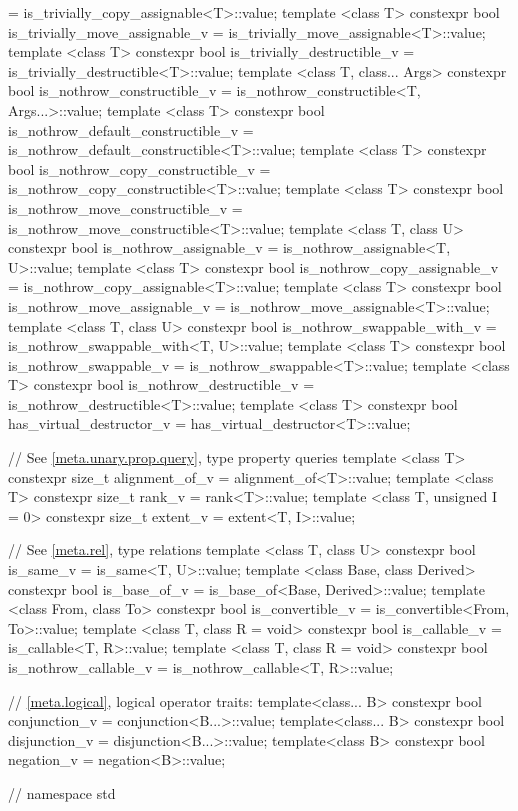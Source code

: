 \begin{codeblock}
{    = is_trivially_copy_assignable<T>::value;
  template <class T> constexpr bool is_trivially_move_assignable_v
    = is_trivially_move_assignable<T>::value;
  template <class T> constexpr bool is_trivially_destructible_v
    = is_trivially_destructible<T>::value;
  template <class T, class... Args> constexpr bool is_nothrow_constructible_v
    = is_nothrow_constructible<T, Args...>::value;
  template <class T> constexpr bool is_nothrow_default_constructible_v
    = is_nothrow_default_constructible<T>::value;
  template <class T> constexpr bool is_nothrow_copy_constructible_v
    = is_nothrow_copy_constructible<T>::value;
  template <class T> constexpr bool is_nothrow_move_constructible_v
    = is_nothrow_move_constructible<T>::value;
  template <class T, class U> constexpr bool is_nothrow_assignable_v
    = is_nothrow_assignable<T, U>::value;
  template <class T> constexpr bool is_nothrow_copy_assignable_v
    = is_nothrow_copy_assignable<T>::value;
  template <class T> constexpr bool is_nothrow_move_assignable_v
    = is_nothrow_move_assignable<T>::value;
  template <class T, class U> constexpr bool is_nothrow_swappable_with_v
    = is_nothrow_swappable_with<T, U>::value;
  template <class T> constexpr bool is_nothrow_swappable_v
    = is_nothrow_swappable<T>::value;
  template <class T> constexpr bool is_nothrow_destructible_v
    = is_nothrow_destructible<T>::value;
  template <class T> constexpr bool has_virtual_destructor_v
    = has_virtual_destructor<T>::value;

  // See \ref{meta.unary.prop.query}, type property queries
  template <class T> constexpr size_t alignment_of_v
    = alignment_of<T>::value;
  template <class T> constexpr size_t rank_v
    = rank<T>::value;
  template <class T, unsigned I = 0> constexpr size_t extent_v
    = extent<T, I>::value;

  // See \ref{meta.rel}, type relations
  template <class T, class U> constexpr bool is_same_v
    = is_same<T, U>::value;
  template <class Base, class Derived> constexpr bool is_base_of_v
    = is_base_of<Base, Derived>::value;
  template <class From, class To> constexpr bool is_convertible_v
    = is_convertible<From, To>::value;
  template <class T, class R = void> constexpr bool is_callable_v
    = is_callable<T, R>::value;
  template <class T, class R = void> constexpr bool is_nothrow_callable_v
    = is_nothrow_callable<T, R>::value;

  // \ref{meta.logical}, logical operator traits:
  template<class... B> constexpr bool conjunction_v = conjunction<B...>::value;
  template<class... B> constexpr bool disjunction_v = disjunction<B...>::value;
  template<class B> constexpr bool negation_v = negation<B>::value;
} // namespace std
\end{codeblock}


